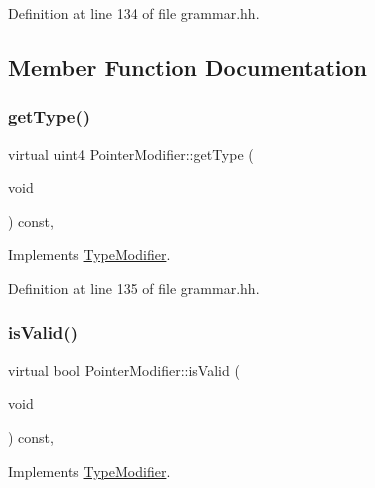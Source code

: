 Definition at line 134 of file grammar.\+hh.



\subsection{Member Function Documentation}
\mbox{\label{class_pointer_modifier_a5d4393bc7783b11b1c4d8f3c95aa3000}} 
\subsubsection{\texorpdfstring{getType()}{getType()}}
{\footnotesize\ttfamily virtual uint4 Pointer\+Modifier\+::get\+Type (\begin{DoxyParamCaption}\item[{void}]{ }\end{DoxyParamCaption}) const\hspace{0.3cm}{\ttfamily [inline]}, {\ttfamily [virtual]}}



Implements \mbox{\hyperlink{class_type_modifier_aac3cedefacdceace7669f57b9bd42df6}{Type\+Modifier}}.



Definition at line 135 of file grammar.\+hh.

\mbox{\label{class_pointer_modifier_ae1220f9b7a325ac324fcfcf731f9c4cc}} 
\subsubsection{\texorpdfstring{isValid()}{isValid()}}
{\footnotesize\ttfamily virtual bool Pointer\+Modifier\+::is\+Valid (\begin{DoxyParamCaption}\item[{void}]{ }\end{DoxyParamCaption}) const\hspace{0.3cm}{\ttfamily [inline]}, {\ttfamily [virtual]}}



Implements \mbox{\hyperlink{class_type_modifier_a67477f048c4ede6b0a0419bf399f2113}{Type\+Modifier}}.



